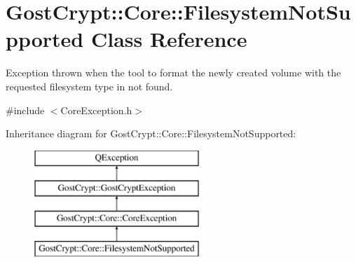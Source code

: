 \hypertarget{class_gost_crypt_1_1_core_1_1_filesystem_not_supported}{}\section{Gost\+Crypt\+:\+:Core\+:\+:Filesystem\+Not\+Supported Class Reference}
\label{class_gost_crypt_1_1_core_1_1_filesystem_not_supported}


Exception thrown when the tool to format the newly created volume with the requested filesystem type in not found.  




{\ttfamily \#include $<$Core\+Exception.\+h$>$}

Inheritance diagram for Gost\+Crypt\+:\+:Core\+:\+:Filesystem\+Not\+Supported\+:\begin{figure}[H]
\begin{center}
\leavevmode
\includegraphics[height=4.000000cm]{class_gost_crypt_1_1_core_1_1_filesystem_not_supported}
\end{center}
\end{figure}
